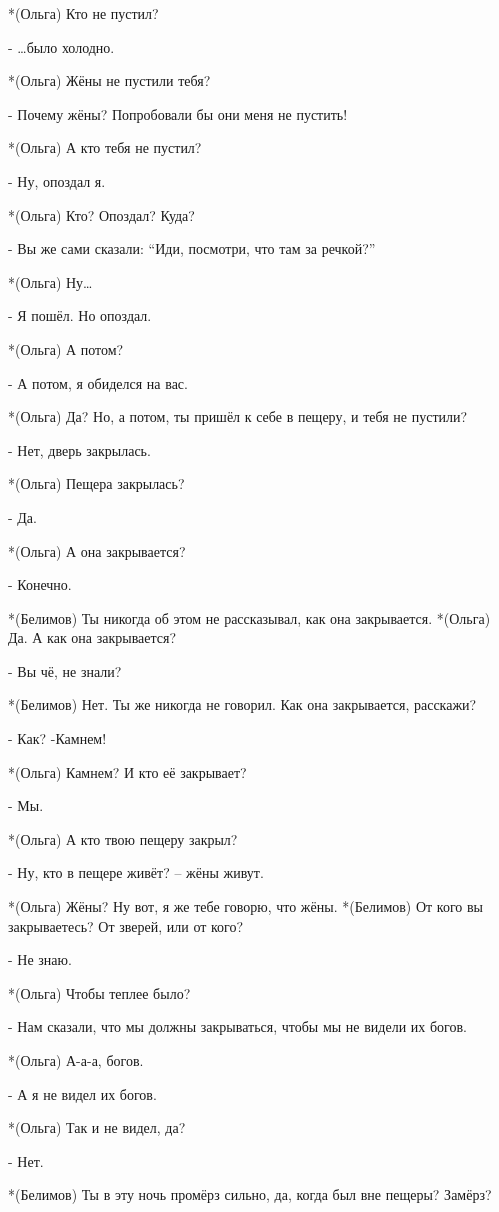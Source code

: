 *(Ольга) Кто не пустил?

- …было холодно.

*(Ольга) Жёны не пустили тебя?

- Почему жёны? Попробовали бы они меня не пустить!

*(Ольга) А кто тебя не пустил?

- Ну, опоздал я.

*(Ольга) Кто? Опоздал? Куда?

- Вы же сами сказали: “Иди, посмотри, что там за речкой?”

*(Ольга) Ну…

- Я пошёл. Но опоздал.

*(Ольга) А потом?

- А потом, я обиделся на вас.

*(Ольга) Да? Но, а потом, ты пришёл к себе в пещеру, и тебя не пустили?

- Нет, дверь закрылась.

*(Ольга) Пещера закрылась?

- Да.

*(Ольга) А она закрывается?

- Конечно.

*(Белимов) Ты никогда об этом не рассказывал, как она закрывается.
*(Ольга) Да. А как она закрывается?

- Вы чё, не знали?

*(Белимов) Нет. Ты же никогда не говорил. Как она закрывается, расскажи?

- Как? -Камнем!

*(Ольга) Камнем? И кто её закрывает?

- Мы.

*(Ольга) А кто твою пещеру закрыл?

- Ну, кто в пещере живёт? – жёны живут.

*(Ольга) Жёны? Ну вот, я же тебе говорю, что жёны.
*(Белимов) От кого вы закрываетесь? От зверей, или от кого?

- Не знаю.

*(Ольга) Чтобы теплее было?

- Нам сказали, что мы должны закрываться, чтобы мы не видели их богов.

*(Ольга) А-а-а, богов.

- А я не видел их богов.

*(Ольга) Так и не видел, да?

- Нет.

*(Белимов) Ты в эту ночь промёрз сильно, да, когда был вне пещеры? Замёрз?

